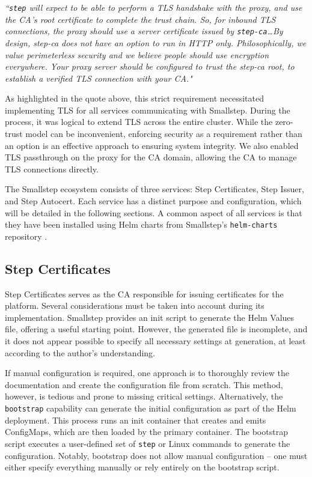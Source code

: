 \begin{displayquote}
    \textit{``\texttt{step} will expect to be able to perform a TLS handshake with the proxy, and use the CA's root certificate to complete the trust chain. So, for inbound TLS connections, the proxy should use a server certificate issued by \texttt{step-ca}\ldots By design, step-ca does not have an option to run in HTTP only. Philosophically, we value perimeterless security and we believe people should use encryption everywhere. Your proxy server should be configured to trust the step-ca root, to establish a verified TLS connection with your CA."\parencite{smallstep_step_ca}}
\end{displayquote}
    \hspace*{}

As highlighted in the quote above, this strict requirement necessitated implementing TLS for all services communicating with Smallstep. During the process, it was logical to extend TLS across the entire cluster. While the zero-trust model can be inconvenient, enforcing security as a requirement rather than an option is an effective approach to ensuring system integrity. We also enabled TLS passthrough on the proxy for the CA domain, allowing the CA to manage TLS connections directly.

The Smallstep ecosystem consists of three services: Step Certificates, Step Issuer, and Step Autocert. Each service has a distinct purpose and configuration, which will be detailed in the following sections. A common aspect of all services is that they have been installed using Helm charts from Smallstep's \texttt{helm-charts} repository \parencite{smallstep_helm_charts}.

\subsection{Step Certificates}
Step Certificates serves as the CA responsible for issuing certificates for the platform. Several considerations must be taken into account during its implementation. Smallstep provides an init script to generate the Helm Values file, offering a useful starting point. However, the generated file is incomplete, and it does not appear possible to specify all necessary settings at generation, at least according to the author's understanding.

If manual configuration is required, one approach is to thoroughly review the documentation and create the configuration file from scratch. This method, however, is tedious and prone to missing critical settings. Alternatively, the \texttt{bootstrap} capability can generate the initial configuration as part of the Helm deployment. This process runs an init container that creates and emits ConfigMaps, which are then loaded by the primary container. The bootstrap script executes a user-defined set of \texttt{step} or Linux commands to generate the configuration. Notably, bootstrap does not allow manual configuration -- one must either specify everything manually or rely entirely on the bootstrap script.

